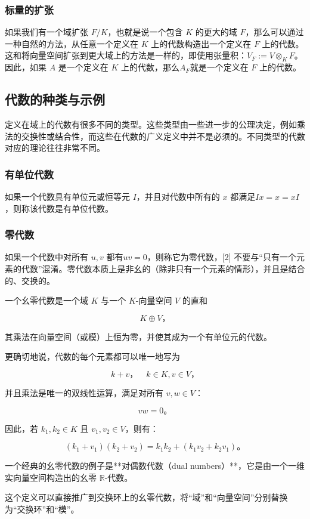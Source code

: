\subsubsection{标量的扩张}
如果我们有一个域扩张 $F/K$，也就是说一个包含 $K$ 的更大的域 $F$，那么可以通过一种自然的方法，从任意一个定义在 $K$ 上的代数构造出一个定义在 $F$ 上的代数。这和将向量空间扩张到更大域上的方法是一样的，即使用张量积：$V_F := V \otimes_K F
$。因此，如果 $A$ 是一个定义在 $K$ 上的代数，那么$A_F$就是一个定义在 $F$ 上的代数。
\subsection{代数的种类与示例}
定义在域上的代数有很多不同的类型。这些类型由一些进一步的公理决定，例如乘法的交换性或结合性，而这些在代数的广义定义中并不是必须的。不同类型的代数对应的理论往往非常不同。
\subsubsection{有单位代数}
如果一个代数具有单位元或恒等元 $I$，并且对代数中所有的 $x$ 都满足$I x = x = x I$，则称该代数是有单位代数。
\subsubsection{零代数}
如果一个代数中对所有 $u, v$ 都有$uv = 0$，则称它为零代数，[2] 不要与“只有一个元素的代数”混淆。零代数本质上是非幺的（除非只有一个元素的情形），并且是结合的、交换的。

一个幺零代数是一个域 $K$ 与一个 $K$-向量空间 $V$ 的直和

$$
K \oplus V，
$$

其乘法在向量空间（或模）上恒为零，并使其成为一个有单位元的代数。

更确切地说，代数的每个元素都可以唯一地写为

$$
k + v， \quad k \in K, v \in V，
$$

并且乘法是唯一的双线性运算，满足对所有 $v, w \in V$：

$$
vw = 0。
$$

因此，若 $k_1, k_2 \in K$ 且 $v_1, v_2 \in V$，则有：

$$
(k_1 + v_1)(k_2 + v_2) = k_1k_2 + (k_1v_2 + k_2v_1)。
$$

一个经典的幺零代数的例子是**对偶数代数（dual numbers）**，它是由一个一维实向量空间构造出的幺零 $ \mathbb{R}$-代数。

这个定义可以直接推广到交换环上的幺零代数，将“域”和“向量空间”分别替换为“交换环”和“模”。

